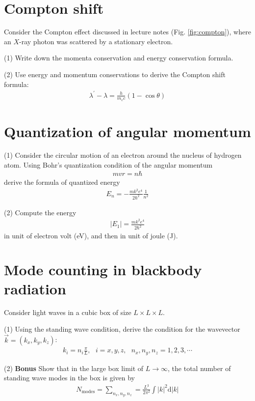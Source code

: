 \section{Compton shift}

Consider the Compton effect discussed in lecture notes (Fig. \ref{fig:compton}), where an $X$-ray photon was scattered by a stationary electron. 

(1) Write down the momenta conservation and energy conservation formula. 

(2) Use energy and momentum conservations to derive the Compton shift formula:
\begin{align}
    \lambda^\prime-\lambda=\frac{h}{m_ec}(1-\cos\theta)
\end{align}

\section{Quantization of angular momentum}

(1) Consider the circular motion of an electron around the nucleus of hydrogen atom. Using Bohr's quantization condition of the angular momentum
\begin{align}
    mvr=n\hbar
\end{align}
derive the formula of quantized energy
\begin{align}
E_n=-\frac{mk^2e^4}{2\hbar^2}\frac1{n^2}
\end{align}

(2) Compute the energy
\begin{align}
    |E_1|=\frac{mk^2e^4}{2\hbar^2}
\end{align}
in unit of electron volt (eV), and then in unit of joule (J). 

\section{Mode counting in blackbody radiation}

Consider light waves in a cubic box of size $L\times L\times L$. 

(1) Using the standing wave condition, derive the condition for the wavevector $\vec k=(k_x,k_y,k_z)$:
\begin{align}
    k_i=n_i\frac\pi L,~~~i=x,y,z,~~~n_{x},n_y,n_z=1,2,3,\cdots
\end{align}

(2) \textbf{Bonus} Show that in the large box limit of $L\rightarrow\infty$, the total number of standing wave modes in the box is given by
\begin{align}
    N_\text{modes}=\sum_{n_x,n_y,n_z}=\frac{L^3}{2\pi^2}\int|k|^2\text{d}|k|
\end{align}




